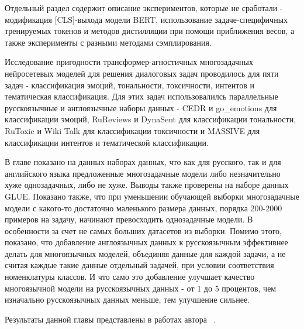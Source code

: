 Отдельный раздел содержит описание экспериментов, которые не сработали - модификация [CLS]-выхода модели BERT, использование задаче-специфичных тренируемых токенов и методов дистилляции при помощи приближения весов, а также эксперименты с разными методами сэмплирования. 

Исследование пригодности трансформер-агностичных многозадачных нейросетевых моделей для решения диалоговых задач проводилось для пяти задач - классификация эмоций, тональности, токсичности, интентов и тематическая классификация. Для этих задач использовалилсь параллельные русскоязычные и англоязычные наборы данных - CEDR и go\_emotions для классификации эмоций, RuReviews и DynaSent для классификации тональности, RuToxic и Wiki Talk для классификации токсичности и MASSIVE для классификации интентов и тематической классификации.

В главе показано на данных наборах данных, что как для русского, так и для английского языка предложенные многозадачные модели либо незначительно хуже однозадачных, либо не хуже. Выводы также проверены на наборе данных GLUE. Показано также, что при уменьшении обучающей выборки многозадачные модели с какого-то достаточно маленького размера данных, порядка 200-2000 примеров на задачу, начинают превосходить однозадачные модели. В особенности за счет не самых больших датасетов из выборки. Помимо этого, показано, что добавление англоязычных данных к русскоязычным эффективнее делать для многоязычных моделей, объединяя данные для каждой задачи, а не считая каждые такие данные отдельный задачей, при условии соответствия номенклатуры классов. И что само это добавление улучшает качество многоязычной модели на русскоязычных данных - от 1 до 5 процентов, чем изначально русскоязычных данных меньше, тем улучшение сильнее.


Результаты данной главы представлены в работах автора ~\cite{rumtl,enmtl}.

